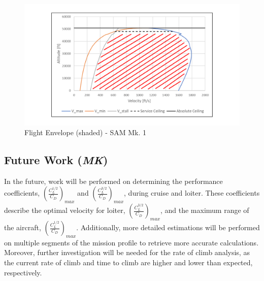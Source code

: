 \begin{figure}[!h]
    \centering
    \includegraphics[width=1.0\textwidth]{Photos/Flight_Envelope.pdf}
    \caption{Flight Envelope (shaded) -  SAM Mk. 1}
    \label{flyenv}
 \end{figure}

\subsection{Future Work (\textit{MK})}
In the future, work will be performed on determining the performance coefficients, $(\frac{C_{L}^{1/2}}{C_{D}})_{max}$ and $(\frac{C_{L}^{3/2}}{C_{D}})_{max}$, during cruise and loiter. These coefficients describe the optimal velocity for loiter, $(\frac{C_{L}^{3/2}}{C_{D}})_{max}$, and the maximum range of the aircraft, $(\frac{C_{L}^{1/2}}{C_{D}})_{max}$. Additionally, more detailed estimations will be performed on multiple segments of the mission profile to retrieve more accurate calculations. Moreover, further investigation will be needed for the rate of climb analysis, as the current rate of climb and time to climb are higher and lower than expected, respectively. 



